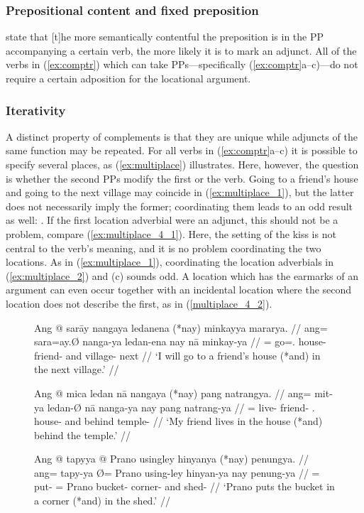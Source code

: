 \subsubsection{Prepositional content and fixed preposition}

\citet{needhamtoivonen2011} state that 
{[t]he more semantically contentful the preposition is in the PP accompanying a
certain verb, the more likely it is to mark an adjunct}. All of the verbs in
(\ref{ex:comptr}) which can take PPs---specifically (\ref{ex:comptr}a--c)---do
not require a certain adposition for the locational argument.

\subsubsection{Iterativity}

A distinct property of complements is that they are unique while adjuncts of
the same function may be repeated. For all verbs in (\ref{ex:comptr}a--c) it is
possible to specify several places, as (\ref{ex:multiplace}) illustrates. Here,
however, the question is whether the second PPs modify the first or the verb.
Going to a friend's house and going to the next village may coincide in
(\ref{ex:multiplace_1}), but the latter does not necessarily imply the former;
coordinating them leads to an odd result as well: . If the first location adverbial were an adjunct, this
should not be a problem, compare (\ref{ex:multiplace_4_1}). Here, the setting
of the kiss is not central to the verb's meaning, and it is no problem
coordinating the two locations. As in (\ref{ex:multiplace_1}), coordinating the
location adverbials in (\ref{ex:multiplace_2}) and (c) sounds odd. A location
which has the earmarks of an argument can even occur together with an
incidental location where the second location does not describe the first, as
in (\ref{multiplace_4_2}).

\begin{figure}
\pex\label{ex:multiplace}
\a\label{ex:multiplace_1}\begingl
	\gla Ang @ sarāy nangaya ledanena (*nay) minkayya mararya. //
	\glb ang= sara=ay.Ø nanga-ya ledan-ena nay nā minkay-ya //
	\glc \AgtT{}= go=\Fsg{}.\Top{} house-\Loc{} friend-\Gen{} and
		village-\Loc{} next //
	\glft `I will go to a friend's house (*and) in the next village.' //
\endgl

\a\label{ex:multiplace_2}\begingl
	\gla Ang @ mica ledan nā nangaya (*nay) pang natrangya. //
	\glb ang= mit-ya ledan-Ø nā nanga-ya nay pang natrang-ya //
	\glc \AgtT{}= live-\TsgM{} friend-\Top{} \Fsg{}.\Gen{} house-\Loc{} and
		behind temple-\Loc{} //
	\glft `My friend lives in the house (*and) behind the temple.' //
\endgl

\a\label{ex:multiplace_3}\begingl
	\gla Ang @ tapyya {} @ Prano usingley hinyanya (*nay) penungya. //
	\glb ang= tapy-ya Ø= Prano using-ley hinyan-ya nay penung-ya //
	\glc \AgtT{}= put-\TsgM{} \Top{}= Prano bucket-\PargI{} corner-\Loc{}
		and shed-\Loc {} //
	\glft `Prano puts the bucket in a corner (*and) in the shed.' //
\endgl

\xe
\end{figure}

